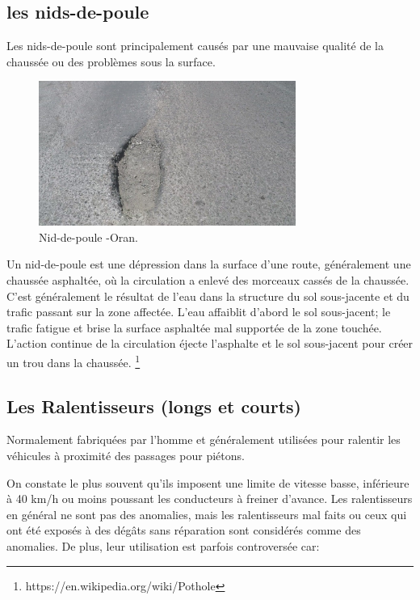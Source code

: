 \subsection{les nids-de-poule}

Les nids-de-poule sont principalement causés par une mauvaise qualité de la chaussée ou des problèmes sous la surface.

\begin{figure}[h!]
  \center
  \includegraphics[width=0.75\textwidth]{Images/chapter1/Pothole.jpg}
  \caption{Nid-de-poule -Oran.}
\end{figure}

Un nid-de-poule est une dépression dans la surface d'une route, généralement une chaussée asphaltée, où la circulation
a enlevé des morceaux cassés de la chaussée.
C'est généralement le résultat de l'eau dans la structure du sol sous-jacente et du trafic passant sur la zone affectée.
L'eau affaiblit d'abord le sol sous-jacent; le trafic fatigue et brise la surface asphaltée mal supportée de la zone touchée.
L'action continue de la circulation éjecte l'asphalte et le sol sous-jacent pour créer un trou dans la chaussée.
\footnote{https://en.wikipedia.org/wiki/Pothole}



\subsection{Les Ralentisseurs (longs et courts)}

Normalement fabriquées par l'homme et généralement utilisées pour ralentir les véhicules à proximité des passages pour piétons.

On constate le plus souvent qu'ils imposent une limite de vitesse basse, inférieure à 40 km/h ou moins poussant les conducteurs à freiner d'avance.
Les ralentisseurs en général ne sont pas des anomalies, mais les ralentisseurs mal faits ou ceux qui ont été exposés à des dégâts sans réparation sont considérés comme des anomalies.
De plus, leur utilisation est parfois controversée car:

